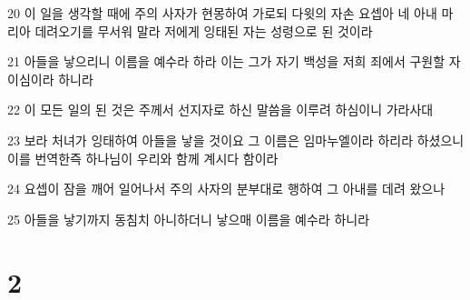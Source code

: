 \par 20 이 일을 생각할 때에 주의 사자가 현몽하여 가로되 다윗의 자손 요셉아 네 아내 마리아 데려오기를 무서워 말라 저에게 잉태된 자는 성령으로 된 것이라
\par 21 아들을 낳으리니 이름을 예수라 하라 이는 그가 자기 백성을 저희 죄에서 구원할 자이심이라 하니라
\par 22 이 모든 일의 된 것은 주께서 선지자로 하신 말씀을 이루려 하심이니 가라사대
\par 23 보라 처녀가 잉태하여 아들을 낳을 것이요 그 이름은 임마누엘이라 하리라 하셨으니 이를 번역한즉 하나님이 우리와 함께 계시다 함이라
\par 24 요셉이 잠을 깨어 일어나서 주의 사자의 분부대로 행하여 그 아내를 데려 왔으나
\par 25 아들을 낳기까지 동침치 아니하더니 낳으매 이름을 예수라 하니라

\chapter{2}

